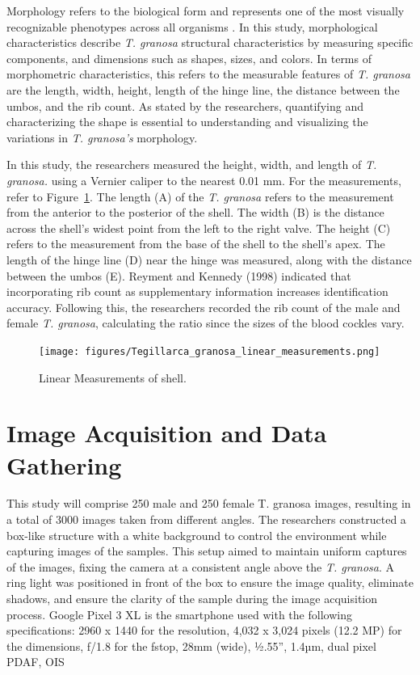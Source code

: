 Morphology refers to the biological form and represents one of the most visually recognizable phenotypes across all organisms \cite{tsutsumi2023}. In this study, morphological characteristics describe \textit{T. granosa} structural characteristics by measuring specific components, and dimensions such as shapes, sizes, and colors. In terms of morphometric characteristics, this refers to the measurable features of \textit{T. granosa} are the length, width, height, length of the hinge line, the distance between the umbos, and the rib count. As stated by the researchers, quantifying and characterizing the shape is essential to understanding and visualizing the variations in \textit{T. granosa’s} morphology. 

In this study, the researchers measured the height, width, and length of \textit{T. granosa.} using a Vernier caliper to the nearest 0.01 mm. For the measurements, refer to Figure~\ref{fig:linear_measurements}. The length (A) of the \textit{T. granosa} refers to the measurement from the anterior to the posterior of the shell. The width (B) is the distance across the shell’s widest point from the left to the right valve. The height (C) refers to the measurement from the base of the shell to the shell’s apex. The length of the hinge line (D) near the hinge was measured, along with the distance between the umbos (E). 
Reyment and Kennedy (1998) indicated that incorporating rib count as supplementary information increases identification accuracy. Following this, the researchers recorded the rib count of the male and female \textit{T. granosa}, calculating the ratio since the sizes of the blood cockles vary. 

\begin{figure}[!htbp]
	\centering
	\texttt{[image: figures/Tegillarca\_granosa\_linear\_measurements.png]}
	\caption{Linear Measurements of  \Tegillarcagranosa shell.}
	\label{fig:linear_measurements}
\end{figure}

\section{Image Acquisition and Data Gathering}
\label{sec:imageprocess}
This study will comprise 250 male and 250 female T. granosa images, resulting in a total of 3000 images taken from different angles. The researchers constructed a box-like structure with a white background to control the environment while capturing images of the samples. This setup aimed to maintain uniform captures of the images, fixing the camera at a consistent angle above the \textit{T. granosa}. A ring light was positioned in front of the box to ensure the image quality, eliminate shadows, and ensure the clarity of the sample during the image acquisition process. Google Pixel 3 XL is the smartphone used with the following specifications: 2960 x 1440 for the resolution, 4,032 x 3,024 pixels (12.2 MP) for the dimensions, f/1.8 for the fstop, 28mm (wide), ½.55”, 1.4µm, dual pixel PDAF, OIS \cite{concepcion2023}

